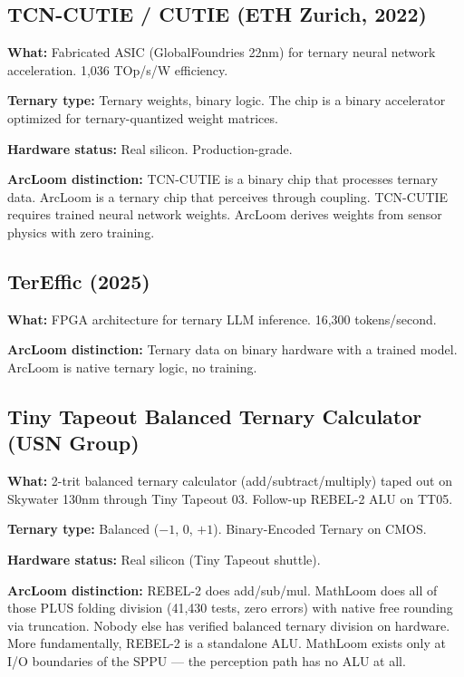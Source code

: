 \documentclass[11pt, a4paper]{article}
\begin{document}
\subsection{TCN-CUTIE / CUTIE (ETH Zurich, 2022)}

\textbf{What:} Fabricated ASIC (GlobalFoundries 22nm) for ternary
neural network acceleration. 1,036 TOp/s/W efficiency.

\textbf{Ternary type:} Ternary weights, binary logic. The chip is a
binary accelerator optimized for ternary-quantized weight matrices.

\textbf{Hardware status:} Real silicon. Production-grade.

\textbf{ArcLoom distinction:} TCN-CUTIE is a binary chip that
processes ternary data. ArcLoom is a ternary chip that perceives
through coupling. TCN-CUTIE requires trained neural network weights.
ArcLoom derives weights from sensor physics with zero training.

\subsection{TerEffic (2025)}

\textbf{What:} FPGA architecture for ternary LLM inference.
16,300 tokens/second.

\textbf{ArcLoom distinction:} Ternary data on binary hardware with
a trained model. ArcLoom is native ternary logic, no training.

\subsection{Tiny Tapeout Balanced Ternary Calculator (USN Group)}

\textbf{What:} 2-trit balanced ternary calculator (add/subtract/multiply)
taped out on Skywater 130nm through Tiny Tapeout 03. Follow-up REBEL-2
ALU on TT05.

\textbf{Ternary type:} Balanced ($-1$, 0, $+1$). Binary-Encoded
Ternary on CMOS.

\textbf{Hardware status:} Real silicon (Tiny Tapeout shuttle).

\textbf{ArcLoom distinction:} REBEL-2 does add/sub/mul. MathLoom
does all of those PLUS folding division (41,430 tests, zero errors)
with native free rounding via truncation. Nobody else has verified
balanced ternary division on hardware. More fundamentally, REBEL-2
is a standalone ALU. MathLoom exists only at I/O boundaries of the
SPPU --- the perception path has no ALU at all.
\end{document}
